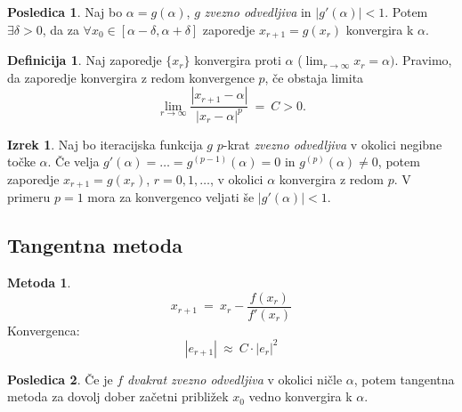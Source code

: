 \documentclass[11pt]{article}
\theoremstyle{definition}
\newtheorem{definicija}{Definicija}[section]
\newtheorem{izrek}{Izrek}
\newtheorem*{posledica}{Posledica}
\newtheorem*{metoda}{Metoda}
\begin{document}
\begin{posledica}

Naj bo $\alpha = g(\alpha)$, $g$ \textit{zvezno odvedljiva} in $|g'(\alpha)| < 1$. Potem $\exists \delta > 0$, da za $\forall x_0 \in [\alpha - \delta, \alpha + \delta]$ zaporedje $x_{r+1} = g(x_r)$ konvergira k $\alpha$.

\end{posledica}
\vspace{0.5cm}

\begin{definicija}

Naj zaporedje $\{ x_r \}$ konvergira proti $\alpha$ ($\lim_{r \rightarrow \infty} x_r = \alpha)$. Pravimo, da zaporedje konvergira z redom konvergence $p$, če obstaja limita
$$\lim_{r \rightarrow \infty} \frac{|x_{r+1} - \alpha|}{|x_r - \alpha|^p} ~=~ C > 0.$$

\end{definicija}
\vspace{0.5cm}

\begin{izrek}

Naj bo iteracijska funkcija $g$ $p$-krat \textit{zvezno odvedljiva} v okolici negibne točke $\alpha$. Če velja $g'(\alpha) = \ldots = g^{(p-1)}(\alpha) = 0$ in $g^{(p)}(\alpha) \neq 0$, potem zaporedje $x_{r+1} = g(x_r)$, $r = 0, 1, \ldots$, v okolici $\alpha$ konvergira z redom $p$. V primeru $p = 1$ mora za konvergenco veljati še $|g'(\alpha)| < 1$. 

\end{izrek}
\vspace{0.5cm}


\subsection{Tangentna metoda}
\vspace{0.5cm}

\begin{metoda}

$$x_{r+1} ~=~ x_r - \frac{f(x_r)}{f'(x_r)}$$
Konvergenca:
$$|e_{r+1}| ~\approx~ C \cdot |e_r|^2$$

\end{metoda}
\vspace{0.5cm}

\begin{posledica}

Če je $f$ \textit{dvakrat zvezno odvedljiva} v okolici ničle $\alpha$, potem tangentna metoda za dovolj dober začetni približek $x_0$ vedno konvergira k $\alpha$.

\end{posledica}
\vspace{0.5cm}
\end{document}
